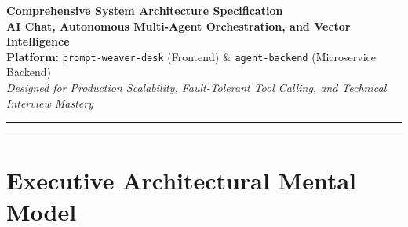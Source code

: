 \documentclass[10pt,a4paper]{article}
\begin{document}
\begin{center}
    {\Huge \textbf{\color{primaryBlue} Comprehensive System Architecture Specification}}\\[0.3em]
    {\Large \textbf{AI Chat, Autonomous Multi-Agent Orchestration, and Vector Intelligence}}\\[0.6em]
    {\normalsize \textbf{Platform:} \texttt{prompt-weaver-desk} (Frontend) \& \texttt{agent-backend} (Microservice Backend)}\\[0.3em]
    {\footnotesize \textit{Designed for Production Scalability, Fault-Tolerant Tool Calling, and Technical Interview Mastery}}\\[0.8em]
    \rule{\linewidth}{1.5pt}
\end{center}

\begin{abstract}
\noindent This document formalizes the end-to-end technical architecture, component breakdown, data lifecycle, mathematical formulations, system constraints, and execution mechanics of the \textbf{PromptWeaver} ecosystem. The platform comprises a reactive Single Page Application (\texttt{prompt-weaver-desk}) coupled with a high-throughput, event-driven Node.js orchestrator (\texttt{agent-backend}). It integrates dynamic multi-model routing (OpenAI, Anthropic Claude, Groq Llama/Mixtral), an automated multi-account key pool with exponential backoff, recursive and semantic Retrieval-Augmented Generation (RAG) powered by Supabase \texttt{pgvector} and Pinecone, multi-agent execution graphs (Sequential, Parallel, Hierarchical, DAG Workflows), multi-turn function-calling loops with circuit breakers, and zero-trust cryptographic protections (AES-256-GCM data encryption and prompt injection sanitization). This specification is structured to provide an intuitive, defensible mental model optimized for architectural evaluations and high-bar engineering interviews.
\end{abstract}

\vspace{0.5em}
\tableofcontents
\vspace{1em}
\hrule
\vspace{1em}

\section{Executive Architectural Mental Model}
\end{document}

